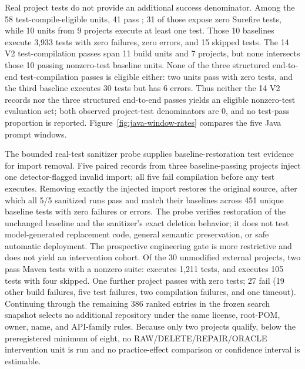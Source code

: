 \documentclass[pdflatex,sn-basic]{sn-jnl}
\newcommand{\codeid}[1]{\texttt{\detokenize{#1}}}
\begin{document}
Real project tests do not provide an additional success denominator. Among the 58 test-compile-eligible units, 41 pass \codeid{clean test}; 31 of those expose zero Surefire tests, while 10 units from 9 projects execute at least one test. Those 10 baselines execute 3,933 tests with zero failures, zero errors, and 15 skipped tests. The 14 V2 test-compilation passes span 11 build units and 7 projects, but none intersects those 10 passing nonzero-test baseline units. None of the three structured end-to-end test-compilation passes is eligible either: two units pass with zero tests, and the third baseline executes 30 tests but has 6 errors. Thus neither the 14 V2 records nor the three structured end-to-end passes yields an eligible nonzero-test evaluation set; both observed project-test denominators are 0, and no test-pass proportion is reported. Figure~\ref{fig:java-window-rates} compares the five Java prompt windows.

The bounded real-test sanitizer probe supplies baseline-restoration test evidence for import removal. Five paired records from three baseline-passing projects inject one detector-flagged invalid import; all five fail compilation before any test executes. Removing exactly the injected import restores the original source, after which all 5/5 sanitized runs pass and match their baselines across 451 unique baseline tests with zero failures or errors. The probe verifies restoration of the unchanged baseline and the sanitizer's exact deletion behavior; it does not test model-generated replacement code, general semantic preservation, or safe automatic deployment.
The prospective engineering gate is more restrictive and does not yield an intervention cohort. Of the 30 unmodified external projects, two pass Maven tests with a nonzero suite: \codeid{aeshell/aesh} executes 1,211 tests, and \codeid{digitalpetri/modbus} executes 105 tests with four skipped. One further project passes with zero tests; 27 fail (19 other build failures, five test failures, two compilation failures, and one timeout). Continuing through the remaining 386 ranked entries in the frozen search snapshot selects no additional repository under the same license, root-POM, owner, name, and API-family rules. Because only two projects qualify, below the preregistered minimum of eight, no RAW/DELETE/REPAIR/ORACLE intervention unit is run and no practice-effect comparison or confidence interval is estimable.
\end{document}
